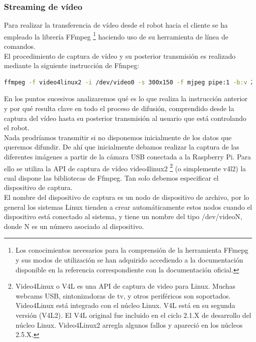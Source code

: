 \subsubsection{ Streaming de vídeo }

Para realizar la transferencia de vídeo desde el robot hacia el cliente se ha empleado la librería FFmpeg \footnote{ Los conocimientos necesarios para la comprensión de la herramienta FFmepg y sus modos de 
utilización se han adquirido accediendo a la documentación disponible en la referencia \cite{website:7} correspondiente con la documentación oficial.} haciendo uso de su herramienta de línea de comandos.\\

El procedimiento de captura de vídeo y su posterior transmisión es realizado mediante la siguiente instrucción de Ffmpeg:\\

\begin{lstlisting}[language=bash]
  ffmpeg -f video4linux2 -i /dev/video0 -s 300x150 -f mjpeg pipe:1 -b:v 28k -bufsize 28k
\end{lstlisting}

En los puntos sucesivos analizaremos qué es lo que realiza la instrucción anterior y por qué resulta clave en todo el proceso de difusión, comprendido desde la captura del 
vídeo hasta su posterior transmisión al usuario que está controlando el robot.\\

Nada prodríamos transmitir si no disponemos inicialmente de los datos que queremos difundir. De ahí que inicialmente debamos realizar la captura de las diferentes imágenes a partir de la cámara
USB conectada a la Raspberry Pi. Para ello se utiliza la API de captura de vídeo video4linux2 \footnote{ Video4Linux o V4L es una API de captura de video para Linux. Muchas webcams USB, sintonizadoras
de tv, y otros periféricos son soportados. Video4Linux está integrado con el núcleo Linux. V4L está en su segunda versión (V4L2). El V4L original fue incluido en el ciclo 2.1.X de desarrollo del
núcleo Linux. Video4Linux2 arregla algunos fallos y apareció en los núcleos 2.5.X. } (o simplemente v4l2) la cual dispone las bibliotecas de Ffmpeg. Tan solo debemos especificar el dispositivo de 
captura.\\

El nombre del dispositivo de captura es un nodo de dispositivo de archivo, por lo general los sistemas Linux tienden a crear automáticamente estos nodos cuando el dispositivo
está conectado al sistema, y ​​tiene un nombre del tipo /dev/videoN, donde N es un número asociado al dispositivo.\\ 



